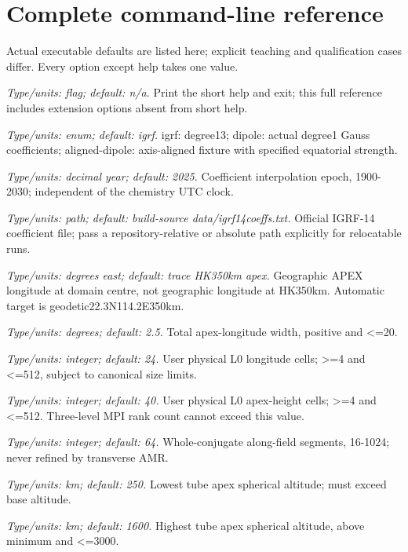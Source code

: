 \section{Complete command-line reference}
Actual executable defaults are listed here; explicit teaching and qualification cases differ. Every option except help takes one value.
\begin{description}[style=nextline,leftmargin=0pt,labelindent=0pt,labelwidth=0pt,labelsep=0pt]
\item[\texttt{--help}] \textit{Type/units: flag; default: n/a.} Print the short help and exit; this full reference includes extension options absent from short help.
\item[\texttt{--field}] \textit{Type/units: enum; default: igrf.} igrf: degree13; dipole: actual degree1 Gauss coefficients; aligned-dipole: axis-aligned fixture with specified equatorial strength.
\item[\texttt{--year}] \textit{Type/units: decimal year; default: 2025.} Coefficient interpolation epoch, 1900-2030; independent of the chemistry UTC clock.
\item[\texttt{--coeff}] \textit{Type/units: path; default: build-source data/igrf14coeffs.txt.} Official IGRF-14 coefficient file; pass a repository-relative or absolute path explicitly for relocatable runs.
\item[\texttt{--lon-deg}] \textit{Type/units: degrees east; default: trace HK350km apex.} Geographic APEX longitude at domain centre, not geographic longitude at HK350km. Automatic target is geodetic22.3N114.2E350km.
\item[\texttt{--span-deg}] \textit{Type/units: degrees; default: 2.5.} Total apex-longitude width, positive and <=20.
\item[\texttt{--nx}] \textit{Type/units: integer; default: 24.} User physical L0 longitude cells; >=4 and <=512, subject to canonical size limits.
\item[\texttt{--ny}] \textit{Type/units: integer; default: 40.} User physical L0 apex-height cells; >=4 and <=512. Three-level MPI rank count cannot exceed this value.
\item[\texttt{--ns}] \textit{Type/units: integer; default: 64.} Whole-conjugate along-field segments, 16-1024; never refined by transverse AMR.
\item[\texttt{--apex-min-km}] \textit{Type/units: km; default: 250.} Lowest tube apex spherical altitude; must exceed base altitude.
\item[\texttt{--apex-max-km}] \textit{Type/units: km; default: 1600.} Highest tube apex spherical altitude, above minimum and <=3000.

\end{description}
